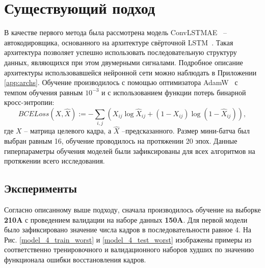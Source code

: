 \documentclass{article}
\begin{document}
\section{Существующий подход}
    В качестве первого метода была рассмотрена модель ConvLSTMAE~\cite{convlstm_nist} -- автокодировщика, основанного на архитектуре свёрточной LSTM~\cite{convlstm_arch}. Такая архитектура позволяет успешно использовать последовательную структуру данных, являющихся при этом двумерными сигналами. Подробное описание архитектуры использовавшейся нейронной сети можно наблюдать в Приложении \ref{app:archs}. Обучение производилось с помощью оптимизатора AdamW~\cite{adamw} с темпом обучения равным $10^{-3}$ и с использованием функции потерь бинарной кросс-энтропии: \begin{equation}\label{BCE}
        BCELoss(X, \hat{X}) := -\sum\limits_{i, j}\left(X_{ij}\log{\hat{X}_{ij}} + (1 - X_{ij})\log{(1 - \hat{X}_{ij})}\right),
    \end{equation}где $X$ -- матрица целевого кадра, а $\hat{X}$ --предсказанного. Размер мини-батча был выбран равным 16, обучение проводилось на протяжении 20 эпох. Данные гиперпараметры обучения моделей были зафиксированы для всех алгоритмов на протяжении всего исследования.
\subsection{Эксперименты}
    Согласно описанному выше подходу, сначала производилось обучение на выборке \textbf{210A} с проведением валидации на наборе данных \textbf{150A}. Для первой модели было зафиксировано значение числа кадров в последовательности равное 4. На Рис. \ref{model_4_train_worst} и \ref{model_4_test_worst} изображены примеры из соответственно тренировочного и валидационного наборов худших по значению функционала ошибки восстановления кадров.
\end{document}
